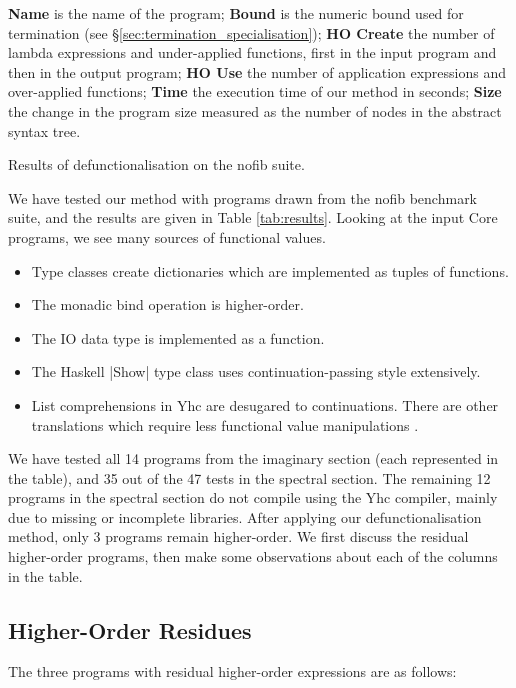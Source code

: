 \begin{table}
\bigskip
\textbf{Name} is the name of the program;
\textbf{Bound} is the numeric bound used for termination (see \S\ref{sec:termination_specialisation});
\textbf{HO Create} the number of lambda expressions and under-applied functions, first in the input program and then in the output program;
\textbf{HO Use} the number of application expressions and over-applied functions;
\textbf{Time} the execution time of our method in seconds;
\textbf{Size} the change in the program size measured as the number of nodes in the abstract syntax tree.
\bigskip

\caption{Results of defunctionalisation on the nofib suite.}
\label{tab:results}
\end{table}

We have tested our method with programs drawn from the nofib benchmark suite, and the results are given in Table \ref{tab:results}. Looking at the input Core programs, we see many sources of functional values.

\begin{itemize}
\item Type classes create dictionaries which are implemented as tuples of functions.
\item The monadic bind operation is higher-order.
\item The IO data type is implemented as a function.
\item The Haskell |Show| type class uses continuation-passing style extensively.
\item List comprehensions in Yhc are desugared to continuations. There are other translations which require less functional value manipulations \cite{wadler:list_comprehensions,coutts:stream_fusion}.
\end{itemize}

We have tested all 14 programs from the imaginary section (each represented in the table), and 35 out of the 47 tests in the spectral section. The remaining 12 programs in the spectral section do not compile using the Yhc compiler, mainly due to missing or incomplete libraries. After applying our defunctionalisation method, only 3 programs remain higher-order. We first discuss the residual higher-order programs, then make some observations about each of the columns in the table.

\subsection{Higher-Order Residues}

The three programs with residual higher-order expressions are as follows:

